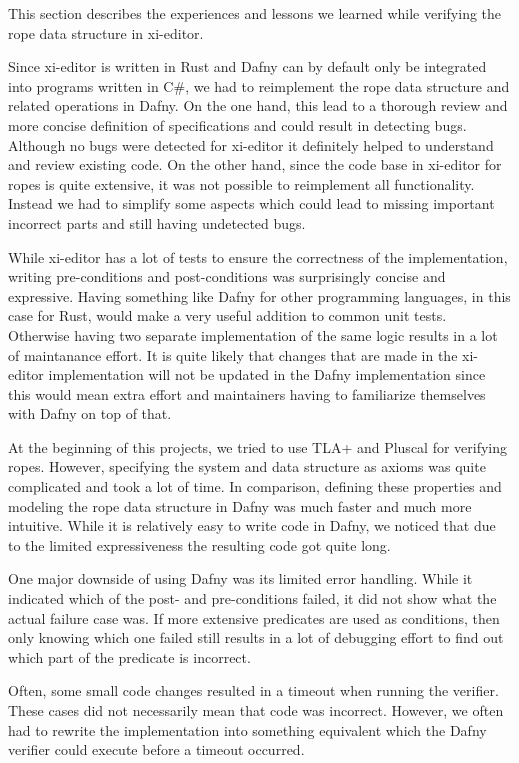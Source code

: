 This section describes the experiences and lessons we learned while verifying the rope data structure in xi-editor.

Since xi-editor is written in Rust and Dafny can by default only be integrated into programs written in C\#, we had to reimplement the rope data structure and related operations in Dafny.
On the one hand, this lead to a thorough review and more concise definition of specifications and could result in detecting bugs. 
Although no bugs were detected for xi-editor it definitely helped to understand and review existing code.
On the other hand, since the code base in xi-editor for ropes is quite extensive, it was not possible to reimplement all functionality.
Instead we had to simplify some aspects which could lead to missing important incorrect parts and still having undetected bugs.

While xi-editor has a lot of tests to ensure the correctness of the implementation, writing pre-conditions and post-conditions was surprisingly concise and expressive.
Having something like Dafny for other programming languages, in this case for Rust, would make a very useful addition to common unit tests.
Otherwise having two separate implementation of the same logic results in a lot of maintanance effort.
It is quite likely that changes that are made in the xi-editor implementation will not be updated in the Dafny implementation since this would mean extra effort and maintainers having to familiarize themselves with Dafny on top of that.

At the beginning of this projects, we tried to use TLA+ and Pluscal for verifying ropes.
However, specifying the system and data structure as axioms was quite complicated and took a lot of time.
In comparison, defining these properties and modeling the rope data structure in Dafny was much faster and much more intuitive.
While it is relatively easy to write code in Dafny, we noticed that due to the limited expressiveness the resulting code got quite long.

One major downside of using Dafny was its limited error handling. 
While it indicated which of the post- and pre-conditions failed, it did not show what the actual failure case was.
If more extensive predicates are used as conditions, then only knowing which one failed still results in a lot of debugging effort to find out which part of the predicate is incorrect.

Often, some small code changes resulted in a timeout when running the verifier.
These cases did not necessarily mean that code was incorrect.
However, we often had to rewrite the implementation into something equivalent which the Dafny verifier could execute before a timeout occurred.

